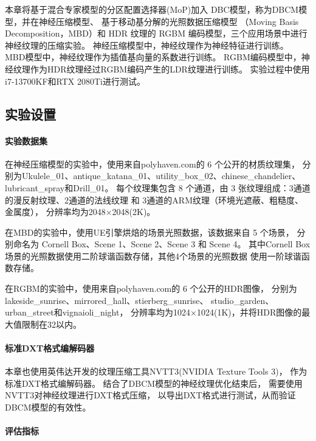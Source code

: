 本章将基于混合专家模型的分区配置选择器(MoP)加入
DBC模型，称为DBCM模型，并在神经压缩模型、
基于移动基分解的光照数据压缩模型
\cite{silvennoinen2021moving}（Moving Basis Decomposition，MBD）和
HDR 纹理的 RGBM 编码模型，三个应用场景中进行神经纹理的压缩实验。
神经压缩模型中，神经纹理作为神经特征进行训练。
MBD模型中，神经纹理作为插值基向量的系数进行训练。
RGBM编码模型中，神经纹理作为HDR纹理经过RGBM编码产生的LDR纹理进行训练。
实验过程中使用i7-13700KF和RTX 2080Ti进行测试。

\subsection{实验设置}

\paragraph{实验数据集}

在神经压缩模型的实验中，使用来自polyhaven.com\cite{PolyHaven}的 6 个公开的材质纹理集，
分别为Ukulele\_01、antique\_katana\_01、utility\_box\_02、chinese\_chandelier、
lubricant\_spray和Drill\_01。
每个纹理集包含 8 个通道，由 3 张纹理组成：3通道的漫反射纹理、2通道的法线纹理 和 3通道的ARM纹理（环境光遮蔽、粗糙度、金属度），
分辨率均为2048×2048(2K)。

在MBD的实验中，使用UE引擎烘焙的场景光照数据，该数据来自 5 个场景，
分别命名为 Cornell Box、Scene 1、Scene 2、Scene 3 和 Scene 4。
其中Cornell Box场景的光照数据使用二阶球谐函数存储，其他4个场景的光照数据
使用一阶球谐函数存储。

在RGBM的实验中，使用来自polyhaven.com\cite{PolyHaven}的 6 个公开的HDR图像，
分别为lakeside\_sunrise、mirrored\_hall、stierberg\_sunrise、
studio\_garden、urban\_street和vignaioli\_night，
分辨率均为1024×1024(1K)，并将HDR图像的最大值限制在32以内。

\paragraph{标准DXT格式编解码器}

本章也使用英伟达开发的纹理压缩工具NVTT3\cite{NVTT3}(NVIDIA Texture Tools 3)，
作为标准DXT格式编解码器。
结合了DBCM模型的神经纹理优化结束后，
需要使用NVTT3对神经纹理进行DXT格式压缩，
以导出DXT格式进行测试，从而验证DBCM模型的有效性。

\paragraph{评估指标}

